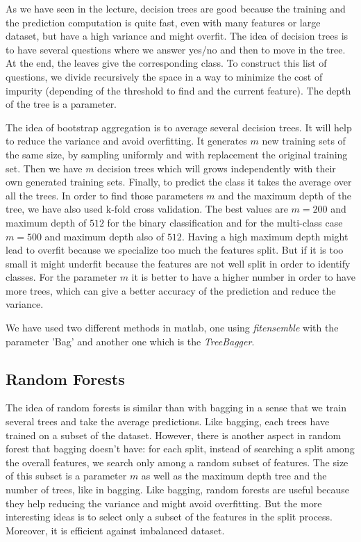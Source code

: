 \documentclass{article} %
\begin{document}
As we have seen in the lecture, decision trees are good because the training and the prediction computation is quite fast, even with many features or large dataset, but have a high variance and might overfit. The idea of decision trees is to have several questions where we answer yes/no and then to move in the tree. At the end, the leaves give the corresponding class. To construct this list of questions, we divide recursively the space in a way to minimize the cost of impurity (depending of the threshold to find and the current feature). The depth of the tree is a parameter.

The idea of bootstrap aggregation is to average several decision trees. It will help to reduce the variance and avoid overfitting. It generates $m$ new training sets of the same size, by sampling uniformly and with replacement the original training set. Then we have $m$ decision trees which will grows independently with their own generated training sets. Finally, to predict the class it takes the average over all the trees. In order to find those parameters $m$ and the maximum depth of the tree, we have also used k-fold cross validation. The best values are $m = 200$ and maximum depth of $512$ for the binary classification and for the multi-class case $m = 500$ and maximum depth also of $512$. Having a high maximum depth might lead to overfit because we specialize too much the features split. But if it is too small it might underfit because the features are not well split in order to identify classes. For the parameter $m$ it is better to have a higher number in order to have more trees, which can give a better accuracy of the prediction and reduce the variance.

We have used two different methods in matlab, one using \textit{fitensemble} with the parameter 'Bag' and another one which is the \textit{TreeBagger}.

\subsection{Random Forests}

The idea of random forests is similar than with bagging in a sense that we train several trees and take the average predictions. Like bagging, each trees have trained on a subset of the dataset. However, there is another aspect in random forest that bagging doesn't have: for each split, instead of searching a split among the overall features, we search only among a random subset of features. The size of this subset is a parameter $m$ as well as the maximum depth tree and the number of trees, like in bagging. Like bagging, random forests are useful because they help reducing the variance and might avoid overfitting. But the more interesting ideas is to select only a subset of the features in the split process. Moreover, it is efficient against imbalanced dataset.
\end{document}

